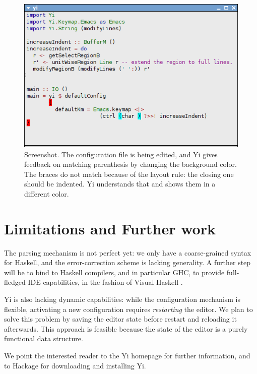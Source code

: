 \documentclass[9pt,indentedstyle,preprint]{sigplanconf}
\begin{document}
\begin{figure}
\includegraphics[width=\columnwidth]{screenshot.png}
\caption{Screenshot. The configuration file is being edited, and Yi
  gives feedback on matching parenthesis by changing the background
  color. The braces do not match because of the layout rule: the
  closing one should be indented. Yi understands that and shows them
  in a different color.}
\label{fig:screenshot}
\end{figure}

\section{Limitations and Further work}

The parsing mechanism is not perfect yet: we only have a coarse-grained
syntax for Haskell, and the error-correction scheme is lacking
generality.  A further step will be to bind to Haskell compilers, and
in particular GHC, to provide full-fledged IDE capabilities, in the
fashion of Visual Haskell \cite{Angelov2005VH}.

Yi is also lacking dynamic capabilities: while the configuration
mechanism is flexible, activating a new configuration requires {\em
  restarting} the editor.  We plan to solve this problem by saving the
editor state before restart and reloading it afterwards. This approach is
feasible because the state of the editor is a purely functional data
structure.

We point the interested reader to the Yi homepage \cite{YiHome} for
further information, and to Hackage \cite{Hackage} for downloading and
installing Yi.

\acks 
\end{document}
